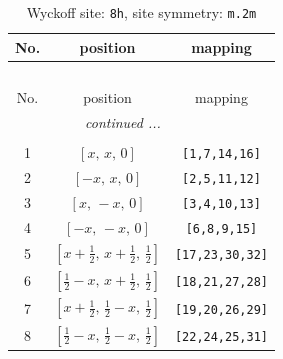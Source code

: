 \documentclass[fleqn,8pt]{jsarticle}
\begin{document}
\begin{longtable}{ccc}
\caption{Wyckoff site: {\tt 8h}, site symmetry: {\tt m.2m}}
 \\
 \hline \hline
No. & position & mapping \\ \hline \endfirsthead

\multicolumn{2}{l}{\tablename\ \thetable{}} \\
 \hline \hline
No. & position & mapping \\ \hline \endhead

 \hline \hline
\multicolumn{2}{r}{\footnotesize\it continued ...} \\ \endfoot

 \hline \hline
\multicolumn{2}{r}{} \\ \endlastfoot

1 & $\left[ x,\, x,\, 0 \right]$ & {\tt [1,7,14,16]} \\ \hline
2 & $\left[ - x,\, x,\, 0 \right]$ & {\tt [2,5,11,12]} \\ \hline
3 & $\left[ x,\, - x,\, 0 \right]$ & {\tt [3,4,10,13]} \\ \hline
4 & $\left[ - x,\, - x,\, 0 \right]$ & {\tt [6,8,9,15]} \\ \hline
5 & $\left[ x + \frac{1}{2},\, x + \frac{1}{2},\, \frac{1}{2} \right]$ & {\tt [17,23,30,32]} \\ \hline
6 & $\left[ \frac{1}{2} - x,\, x + \frac{1}{2},\, \frac{1}{2} \right]$ & {\tt [18,21,27,28]} \\ \hline
7 & $\left[ x + \frac{1}{2},\, \frac{1}{2} - x,\, \frac{1}{2} \right]$ & {\tt [19,20,26,29]} \\ \hline
8 & $\left[ \frac{1}{2} - x,\, \frac{1}{2} - x,\, \frac{1}{2} \right]$ & {\tt [22,24,25,31]} \\
\end{longtable}
\renewcommand{\arraystretch}{1.2}
\end{document}
